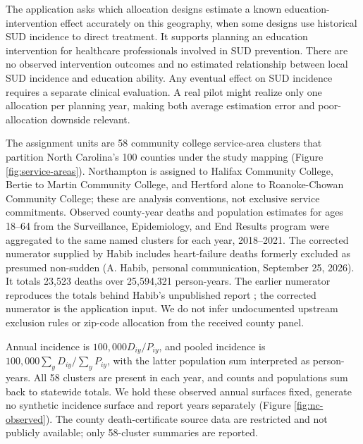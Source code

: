 \documentclass[11pt]{article}
\begin{document}
The application asks which allocation designs estimate a known
education-intervention effect accurately on this geography, when some
designs use historical SUD incidence to direct treatment. It supports
planning an education intervention for healthcare professionals involved
in SUD prevention. There are no observed intervention outcomes and no
estimated relationship between local SUD incidence and education
ability. Any eventual effect on SUD incidence requires a separate
clinical evaluation. A real pilot might realize only one allocation per
planning year, making both average estimation error and poor-allocation
downside relevant.

The assignment units are 58 community college service-area clusters that
partition North Carolina's 100 counties under the study mapping (Figure
\ref{fig:service-areas}). Northampton is assigned to Halifax Community
College, Bertie to Martin Community College, and Hertford alone to
Roanoke-Chowan Community College; these are analysis conventions, not
exclusive service commitments. Observed county-year deaths and population estimates for ages 18--64 from the Surveillance, Epidemiology, and End Results program were aggregated to the same named clusters for
each year, 2018--2021. The corrected numerator supplied by Habib
includes heart-failure deaths formerly excluded as presumed non-sudden
(A. Habib, personal communication, September 25, 2026). It totals 23,523
deaths over 25,594,321 person-years. The earlier numerator reproduces
the totals behind Habib's unpublished report
\citep{habib_temporal_2026}; the corrected numerator is the application
input. We do not infer undocumented upstream exclusion rules or zip-code
allocation from the received county panel.

Annual incidence is \(100,000D_{iy}/P_{iy}\), and pooled incidence is
\(100,000\sum_yD_{iy}/\sum_yP_{iy}\), with the latter population sum
interpreted as person-years. All 58 clusters are present in each year,
and counts and populations sum back to statewide totals. We hold these
observed annual surfaces fixed, generate no synthetic incidence surface
and report years separately (Figure \ref{fig:nc-observed}). The county death-certificate source data are restricted and not publicly available; only 58-cluster summaries are reported.
\end{document}
